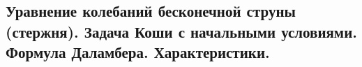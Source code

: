 \subsection{Уравнение колебаний бесконечной струны (стержня). Задача Коши с начальными условиями. Формула Даламбера. Характеристики.}